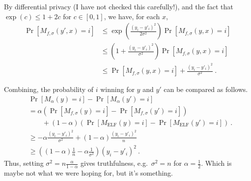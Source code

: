 \documentclass[letterpaper,12pt]{article}
\newcommand{\1}{\mathbbm{1}}
\newcommand{\elf}{M_{\mathrm{ELF}}}
\begin{document}
By differential privacy (I have not checked this carefully!), and the fact that $\exp(c) \leq 1+2c$ for $c\in[0,1]$, we have, for each $x$,
\begin{align}
  \Pr[M_{f,\sigma}(y',x)=i]
  & \leq \exp\left( \frac{(y_i-y'_i)^2}{2\sigma^2} \right) \Pr[M_{f,\sigma}(y,x)=i]
  \\
  & \leq \left(1 + \frac{(y_i-y'_i)^2}{\sigma^2}\right) \Pr[M_{f,\sigma}(y,x)=i]
  \\
  & \leq \Pr[M_{f,\sigma}(y,x)=i] + \frac{(y_i-y'_i)^2}{\sigma^2}~.
\end{align}

Combining, the probability of $i$ winning for $y$ and $y'$ can be compared as follows.
\begin{align}
  &\Pr[M_\alpha(y)=i]-\Pr[M_\alpha(y')=i]\\
  &=\alpha\left(\Pr[M_{f,\sigma}(y)=i] - \Pr[M_{f,\sigma}(y')=i]\right)\\
  &\qquad + (1-\alpha)\left(\Pr[\elf(y)=i] - \Pr[\elf(y')=i]\right)~.
  \\
  &\geq -\alpha \frac{(y_i-y'_i)^2}{\sigma^2} + (1-\alpha) \frac{(y_i-y'_i)^2}{n}
  \\
  &\geq \left((1-\alpha) \frac{1}{n} -\alpha \frac{1}{\sigma^2}\right) (y_i-y'_i)^2~.
\end{align}
Thus, setting $\sigma^2 = n \tfrac \alpha {1-\alpha}$ gives truthfulness, e.g.\ $\sigma^2=n$ for $\alpha=\tfrac 1 2$.
Which is maybe not what we were hoping for, but it's something.





%
\end{document}

